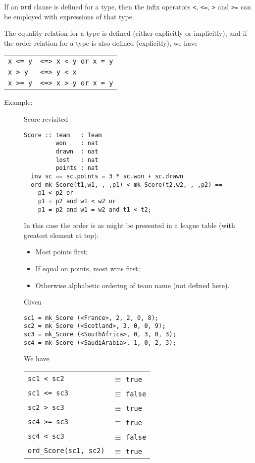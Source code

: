 \documentclass{overturerepchap}
\begin{document}
If an {\tt ord} clause is defined for a type, then the infix operators {\tt <}, {\tt <=}, {\tt >} and {\tt >=} can be employed with expressions of that type.

The equality relation for a type is defined (either explicitly or implicitly), and if the order relation for a type is also defined (explicitly), we have

\begin{tabular}{l l }
{\tt x <= y} & {\tt <=> x < y or x = y} \\
{\tt x > y} & {\tt <=> y < x} \\
{\tt x >= y} & {\tt <=> x > y or x = y}\\
\end{tabular}

\begin{description}
\item [Example:] Score revisited
\begin{lstlisting}
Score :: team   : Team
         won    : nat
         drawn  : nat
         lost   : nat
         points : nat
  inv sc == sc.points = 3 * sc.won + sc.drawn
  ord mk_Score(t1,w1,-,-,p1) < mk_Score(t2,w2,-,-,p2) ==
    p1 < p2 or
    p1 = p2 and w1 < w2 or
    p1 = p2 and w1 = w2 and t1 < t2;
\end{lstlisting}
         
In this case the order is as might be presented in a league table (with greatest element at top):
\begin{itemize}
\item Most points first;
\item If equal on points, most wins first;
\item Otherwise alphabetic ordering of team name (not defined here).
\end{itemize}

Given
\begin{lstlisting}
sc1 = mk_Score (<France>, 2, 2, 0, 8);
sc2 = mk_Score (<Scotland>, 3, 0, 0, 9);
sc3 = mk_Score (<SouthAfrica>, 0, 3, 0, 3);
sc4 = mk_Score (<SaudiArabia>, 1, 0, 2, 3);
\end{lstlisting}
We have

\begin{tabular}{l l}
{\tt sc1 < sc2} & $\equiv$ {\tt true}\\
{\tt sc1 <= sc3} & $\equiv$ {\tt false}\\
{\tt sc2 > sc3} & $\equiv$ {\tt true}\\
{\tt sc4 >= sc3} & $\equiv$ {\tt true}\\
{\tt sc4 < sc3} & $\equiv$ {\tt false}\\
{\tt ord\_Score(sc1, sc2)} & $\equiv$ {\tt true}\\
\end{tabular}


\end{description}
\end{document}
